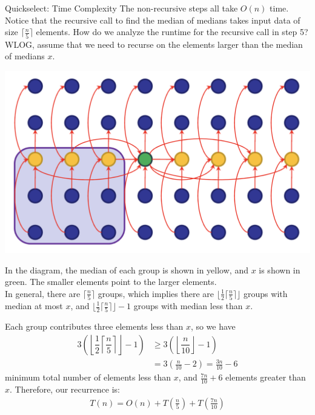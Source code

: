 \documentclass{beamer}
\begin{document}
\begin{frame}{Quickselect: Time Complexity}
    The non-recursive steps all take $O(n)$ time. \\[1em]
    Notice that the recursive call to find the median of medians takes input data of size $\lceil \frac{n}{5} \rceil$ elements. How do we analyze the runtime for the recursive call in step 5? \\[1em]
    WLOG, assume that we need to recurse on the elements larger than the median of medians $x$. 
\end{frame}
\begin{frame}
   \begin{center}
        \includegraphics[scale=0.17]{figures/select_example.png}
   \end{center}
   In the diagram, the median of each group is shown in yellow, and $x$ is shown in green. The smaller elements point to the larger elements. \\[1em]
   In general, there are $\lceil \frac{n}{5} \rceil$ groups, which implies there are $\lfloor \frac{1}{2} \lceil \frac{n}{5} \rceil \rfloor$ groups with median at most $x$, and $\lfloor \frac{1}{2} \lceil \frac{n}{5} \rceil \rfloor - 1$ groups with median less than $x$. 
\end{frame}
\begin{frame}
    Each group contributes three elements less than $x$, so we have 
    \begin{align*}
        3 \left( 
            \left\lfloor\dfrac{1}{2}  \left\lceil \dfrac{n}{5} \right\rceil  \right\rfloor - 1 \right) &\geq 3 \left( 
                \left\lfloor\dfrac{n}{10}\right\rfloor - 1 \right) \\
                &= 3 \left(\frac{n}{10} - 2\right) = \frac{3n}{10} - 6
    \end{align*}
    minimum total number of elements less than $x$, and $\frac{7n}{10} + 6$ elements greater than $x$. Therefore, our recurrence is: 
    \begin{gather*}
        T(n) = O(n) + T \left(\frac{n}{5}\right) + T \left(\frac{7n}{10}\right)
    \end{gather*}
\end{frame}
\end{document}
